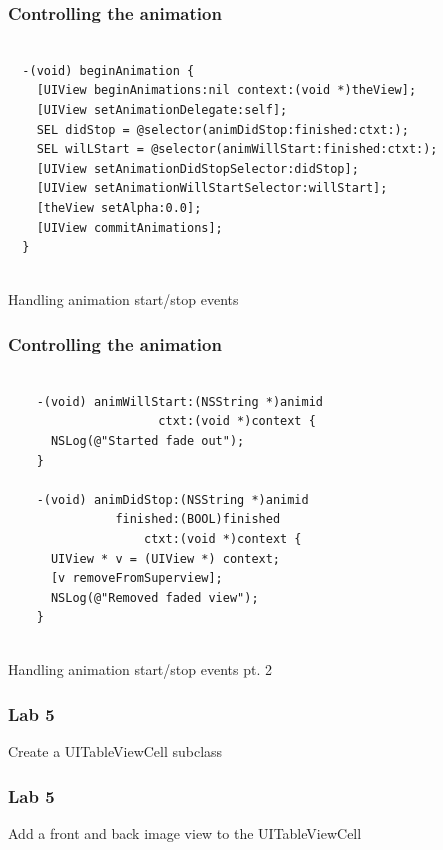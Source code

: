 \documentclass[10pt]{beamer}
\begin{document}
\begin{frame}[fragile]
  \frametitle{Controlling the animation}
  \begin{listing}[H]
    \begin{verbatim}
  
  -(void) beginAnimation {
    [UIView beginAnimations:nil context:(void *)theView];
    [UIView setAnimationDelegate:self];
    SEL didStop = @selector(animDidStop:finished:ctxt:);
    SEL wilLStart = @selector(animWillStart:finished:ctxt:);
    [UIView setAnimationDidStopSelector:didStop];
    [UIView setAnimationWillStartSelector:willStart];
    [theView setAlpha:0.0];
    [UIView commitAnimations];
  }
              
  \end{verbatim}
    \caption{Handling animation start/stop events}
    \label{listing:37}
  \end{listing}

\end{frame}

\begin{frame}[fragile]
  \frametitle{Controlling the animation}
  \begin{listing}[H]
      \begin{verbatim}
    
    -(void) animWillStart:(NSString *)animid
                     ctxt:(void *)context {
      NSLog(@"Started fade out");
    }
                  
    -(void) animDidStop:(NSString *)animid
               finished:(BOOL)finished
                   ctxt:(void *)context {
      UIView * v = (UIView *) context;
      [v removeFromSuperview];
      NSLog(@"Removed faded view");
    }                          
                
    \end{verbatim}
      \caption{Handling animation start/stop events pt. 2}
      \label{listing:38}
    \end{listing}

\end{frame}

    
\begin{frame}[fragile]
  \frametitle{Lab 5}
  Create a UITableViewCell subclass

\end{frame}

\begin{frame}[fragile]
  \frametitle{Lab 5}
  Add a front and back image view to the UITableViewCell

\end{frame}
\end{document}
